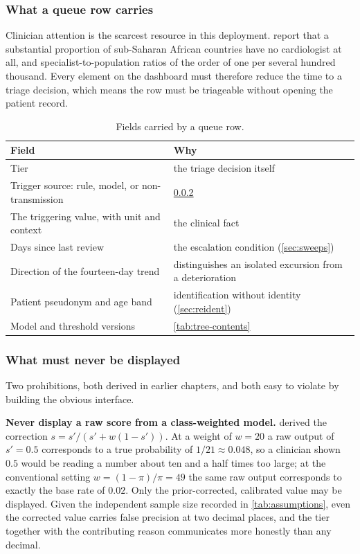\documentclass[12pt,a4paper,oneside]{report}
\begin{document}
\subsubsection{What a queue row carries}\label{sec:queue-row}

Clinician attention is the scarcest resource in this deployment. \Textcite{segun2025} report that a substantial proportion of sub-Saharan African countries have no cardiologist at all, and specialist-to-population ratios of the order of one per several hundred thousand. Every element on the dashboard must therefore reduce the time to a triage decision, which means the row must be triageable without opening the patient record.

\begin{table}[htbp]
\centering\small
\caption{Fields carried by a queue row.}\label{tab:queue-row}
\begin{tabularx}{\textwidth}{@{}>{\raggedright\arraybackslash}p{6.0cm} X@{}}
\toprule
\textbf{Field} & \textbf{Why} \\
\midrule
Tier & the triage decision itself \\
Trigger source: rule, model, or non-transmission & \cref{sec:never-display} \\
The triggering value, with unit and context & the clinical fact \\
Days since last review & the escalation condition (\cref{sec:sweeps}) \\
Direction of the fourteen-day trend & distinguishes an isolated excursion from a deterioration \\
Patient pseudonym and age band & identification without identity (\cref{sec:reident}) \\
Model and threshold versions & \cref{tab:tree-contents} \\
\bottomrule
\end{tabularx}
\end{table}

\subsubsection{What must never be displayed}\label{sec:never-display}

Two prohibitions, both derived in earlier chapters, and both easy to violate by building the obvious interface.

\textbf{Never display a raw score from a class-weighted model.}  derived the correction $s = s'/(s' + w(1-s'))$. At a weight of $w = 20$ a raw output of $s' = 0.5$ corresponds to a true probability of $1/21 \approx 0.048$, so a clinician shown $0.5$ would be reading a number about ten and a half times too large; at the conventional setting $w = (1-\pi)/\pi = 49$ the same raw output corresponds to exactly the base rate of $0.02$. Only the prior-corrected, calibrated value may be displayed. Given the independent sample size recorded in \cref{tab:assumptions}, even the corrected value carries false precision at two decimal places, and the tier together with the contributing reason communicates more honestly than any decimal.
\end{document}
